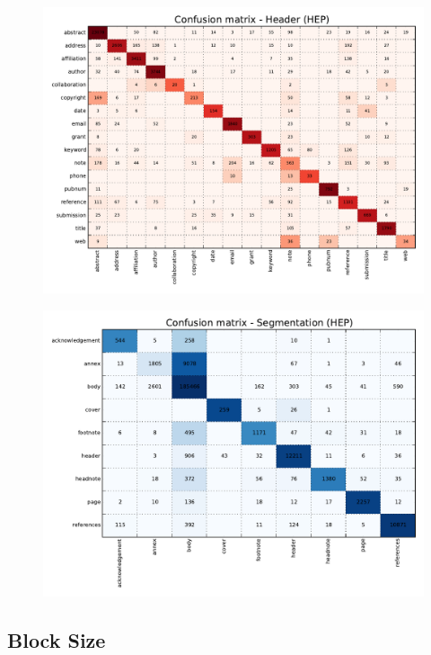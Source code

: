 \begin{figure}[h]
\center
\includegraphics[width=5.5in]{Figures/header_baseline_confusion.pdf}
\caption{}
\label{fig:header_baseline_confusion}
\end{figure}

\begin{figure}[h]
\center
\includegraphics[width=5.5in]{Figures/segmentation_baseline_confusion.pdf}
\caption{}
\label{fig:segmentation_baseline_confusion}
\end{figure}

\subsection{Block Size}

